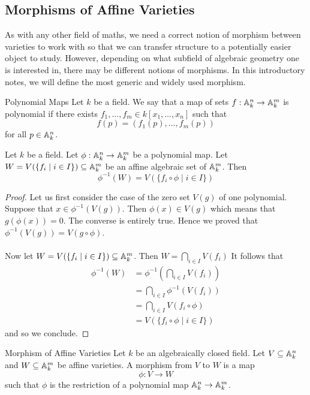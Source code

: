 \documentclass[a4paper]{article}
\begin{document}
\subsection{Morphisms of Affine Varieties}
As with any other field of maths, we need a correct notion of morphism between varieties to work with so that we can transfer structure to a potentially easier object to study. However, depending on what subfield of algebraic geometry one is interested in, there may be different notions of morphisms. In this introductory notes, we will define the most generic and widely used morphism. 

\begin{defn}{Polynomial Maps}{} Let $k$ be a field. We say that a map of sets $f:\mathbb{A}_k^n\to\mathbb{A}_k^m$ is polynomial if there exists $f_1,\dots,f_m\in k[x_1,\dots,x_n]$ such that $$f(p)=(f_1(p),\dots,f_m(p))$$ for all $p\in\mathbb{A}_k^n$. 
\end{defn}

\begin{prp}{}{} Let $k$ be a field. Let $\phi:\mathbb{A}_k^n\to\mathbb{A}_k^m$ be a polynomial map. Let $W=V(\{f_i\;|\;i\in I\})\subseteq\mathbb{A}_k^m$ be an affine algebraic set of $\mathbb{A}_k^m$. Then $$\phi^{-1}(W)=V(\{f_i\circ\phi\;|\;i\in I\})$$ \tcbline
\begin{proof}
Let us first consider the case of the zero set $V(g)$ of one polynomial. Suppose that $x\in\phi^{-1}(V(g))$. Then $\phi(x)\in V(g)$ which means that $g(\phi(x))=0$. The converse is entirely true. Hence we proved that $\phi^{-1}(V(g))=V(g\circ\phi)$. \\~\\

Now let $W=V(\{f_i\;|\;i\in I\})\subseteq\mathbb{A}_k^m$. Then $W=\bigcap_{i\in I}V(f_i)$ It follows that 
\begin{align*}
\phi^{-1}(W)&=\phi^{-1}\left(\bigcap_{i\in I}V(f_i)\right)\\
&=\bigcap_{i\in I}\phi^{-1}\left(V(f_i)\right)\\
&=\bigcap_{i\in I}V(f_i\circ\phi)\\
&=V(\{f_i\circ\phi\;|\;i\in I\})
\end{align*}
and so we conclude. 
\end{proof}
\end{prp}

\begin{defn}{Morphism of Affine Varieties}{} Let $k$ be an algebraically closed field. Let $V\subseteq\mathbb{A}_k^n$ and $W\subseteq\mathbb{A}_k^m$ be affine varieties. A morphism from $V$ to $W$ is a map $$\phi:V\to W$$ such that $\phi$ is the restriction of a polynomial map $\mathbb{A}_k^n\to\mathbb{A}_k^m$. 
\end{defn}
\end{document}
